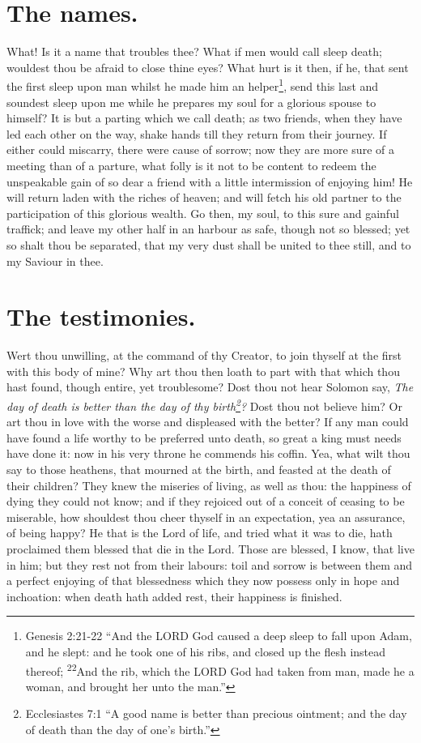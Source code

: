 \section{The names.}
What! Is it a name that troubles thee? What if men would call sleep death; wouldest thou be afraid to close thine eyes? What hurt is it then, if he, that sent the first sleep upon man whilst he made him an helper\footnote{Genesis 2:21-22 ``And the LORD God caused a deep sleep to fall upon Adam, and he slept: and he took one of his ribs, and closed up the flesh instead thereof; \textsuperscript{22}And the rib, which the LORD God had taken from man, made he a woman, and brought her unto the man.''}, send this last and soundest sleep upon me while he prepares my soul for a glorious spouse to himself? It is but a parting which we call death; as two friends, when they have led each other on the way, shake hands till they return from their journey. If either could miscarry, there were cause of sorrow; now they are more sure of a meeting than of a parture, what folly is it not to be content to redeem the unspeakable gain of so dear a friend with a little intermission of enjoying him! He will return laden with the riches of heaven; and will fetch his old partner to the participation of this glorious wealth. Go then, my soul, to this sure and gainful traffick; and leave my other half in an harbour as safe, though not so blessed; yet so shalt thou be separated, that my very dust shall be united to thee still, and to my Saviour in thee. 

\section{The testimonies.} 
Wert thou unwilling, at the command of thy Creator, to join thyself at the first with this body of mine? Why art thou then loath to part with that which thou hast found, though entire, yet troublesome? Dost thou not hear Solomon say, \emph{The day of death is better than the day of thy birth\footnote{Ecclesiastes 7:1 ``A good name is better than precious ointment; and the day of death than the day of one's birth.'' }?} Dost thou not believe him? Or art thou in love with the worse and displeased with the better? If any man could have found a life worthy to be preferred unto death, so great a king must needs have done it: now in his very throne he commends his coffin. Yea, what wilt thou say to those heathens, that mourned at the birth, and feasted at the death of their children? They knew the miseries of living, as well as thou: the happiness of dying they could not know; and if they rejoiced out of a conceit of ceasing to be miserable, how shouldest thou cheer thyself in an expectation, yea an assurance, of being happy? He that is the Lord of life, and tried what it was to die, hath proclaimed them blessed that die in the Lord. Those are blessed, I know, that live in him; but they rest not from their labours: toil and sorrow is between them and a perfect enjoying of that blessedness which they now possess only in hope and inchoation: when death hath added rest, their happiness is finished. 

